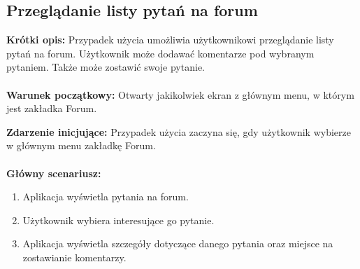 \documentclass[10pt,a4paper]{report}
\begin{document}
\begin{adjustwidth}{2cm}{2cm}
\subsection{Przeglądanie listy pytań na forum}
\begin{minipage}{1\linewidth}
\textbf{Krótki opis:} Przypadek użycia umożliwia użytkownikowi przeglądanie listy pytań na forum. Użytkownik może dodawać komentarze pod wybranym pytaniem. Także może zostawić swoje pytanie.   \\ \\
\textbf{Warunek początkowy:} Otwarty jakikolwiek ekran z głównym menu, w którym jest zakładka Forum. 
\end{minipage}
\begin{minipage}{1\linewidth}
\textbf{Zdarzenie inicjujące:} Przypadek użycia zaczyna się, gdy użytkownik wybierze w głównym menu zakładkę Forum. \\ \\
\textbf{Główny scenariusz:} 
\begin{enumerate}
\setlength\itemsep{0.2cm}
    \item Aplikacja wyświetla pytania na forum.
    \item Użytkownik wybiera interesujące go pytanie.
    \item Aplikacja wyświetla szczegóły dotyczące danego pytania oraz miejsce na zostawianie komentarzy.
\end{enumerate}
\end{minipage}

\end{adjustwidth}
\end{document}
